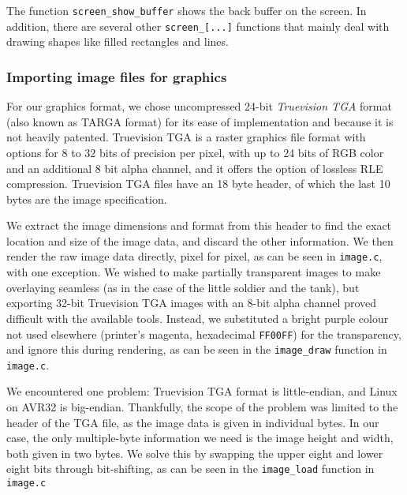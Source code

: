 

The function \texttt{screen\_show\_buffer} shows the back buffer on the
screen. In addition, there are several other \texttt{screen\_[...]}
functions that mainly deal with drawing shapes like filled rectangles
and lines.



\subsubsection{Importing image files for graphics}

For our graphics format, we chose uncompressed 24-bit \emph{Truevision
TGA} format (also known as TARGA format) for its ease of implementation
and because it is not heavily patented. Truevision TGA is a raster
graphics file format with options for 8 to 32 bits of precision per
pixel, with up to 24 bits of RGB color and an additional 8 bit alpha
channel, and it offers the option of lossless RLE compression.
Truevision TGA files have an 18 byte header, of which the last 10 bytes
are the image specification.

We extract the image dimensions and format from this header to find the
exact location and size of the image data, and discard the other
information. We then render the raw image data directly, pixel for
pixel, as can be seen in \texttt{image.c}, with one exception. We wished
to make partially transparent images to make overlaying seamless (as in
the case of the little soldier and the tank), but exporting 32-bit
Truevision TGA images with an 8-bit alpha channel proved difficult with
the available tools. Instead, we substituted a bright purple colour not
used elsewhere (printer's magenta, hexadecimal \texttt{FF00FF}) for the
transparency, and ignore this during rendering, as can be seen in the
\texttt{image\_draw} function in \texttt{image.c}.

We encountered one problem: Truevision TGA format is little-endian, and
Linux on AVR32 is big-endian. Thankfully, the scope of the problem was
limited to the header of the TGA file, as the image data is given in
individual bytes. In our case, the only multiple-byte information we
need is the image height and width, both given in two bytes. We solve
this by swapping the upper eight and lower eight bits through
bit-shifting, as can be seen in the \texttt{image\_load} function in
\texttt{image.c}



